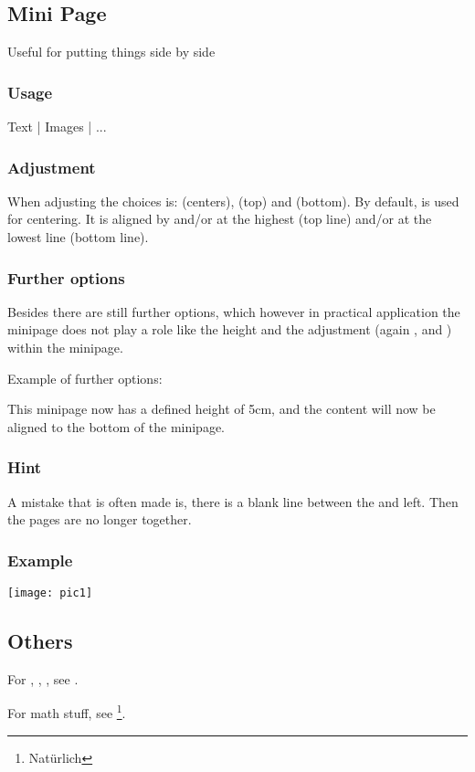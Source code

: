 \subsection{Mini Page} %
Useful for putting things side by side
\subsubsection{Usage}
\begin{latex}
\begin{minipage}[adjusting]{width of the minipage}
 Text | Images | ... 
\end{minipage} 
\end{latex}
\subsubsection{Adjustment}
When adjusting the choices is:  (centers),  (top) and  (bottom).
By default,  is used for centering. It is aligned by  and/or 
at the highest (top line) and/or at the lowest line (bottom line).
\subsubsection{Further options}
Besides there are still further options, which however in practical application the minipage does not play a role like the height and the adjustment (again ,  and ) within the minipage.

Example of further options:

  This minipage now has a defined height of 5cm, and the content will now be aligned to the bottom of the minipage.
\subsubsection{Hint}

A mistake that is often made is, there is a blank line between the \code{\end{minipage}} and
\code{\begin{minipage}} left. Then the pages are no longer together.
  
\subsubsection{Example}
\begin{latex}
\begin{minipage}[t]{0.3\textwidth}
  \texttt{[image: pic1]}
\end{minipage}

\end{latex}

\subsection{Others}
For , , , see .

For math stuff, see \footnote{Natürlich}.
